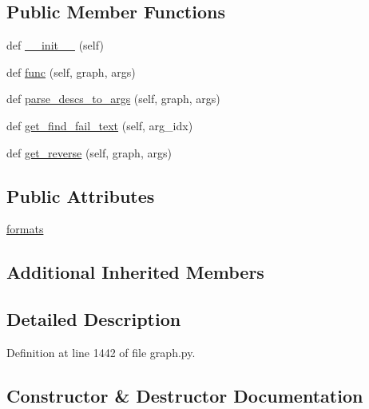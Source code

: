 \subsection*{Public Member Functions}
\begin{DoxyCompactItemize}
\item 
def \hyperlink{classlight__chats_1_1graph_1_1StealObjectFunction_a388f35f7fac6a0b0814254867c0509c4}{\+\_\+\+\_\+init\+\_\+\+\_\+} (self)
\item 
def \hyperlink{classlight__chats_1_1graph_1_1StealObjectFunction_a229fafa57d40e38da54a4b04947e2fe0}{func} (self, graph, args)
\item 
def \hyperlink{classlight__chats_1_1graph_1_1StealObjectFunction_a96475b7b415e03eb52d9efee518e755f}{parse\+\_\+descs\+\_\+to\+\_\+args} (self, graph, args)
\item 
def \hyperlink{classlight__chats_1_1graph_1_1StealObjectFunction_a1ffe38f920399831ab1fba3cd324c106}{get\+\_\+find\+\_\+fail\+\_\+text} (self, arg\+\_\+idx)
\item 
def \hyperlink{classlight__chats_1_1graph_1_1StealObjectFunction_a2e77998e7383d823d66f0adc22226ba0}{get\+\_\+reverse} (self, graph, args)
\end{DoxyCompactItemize}
\subsection*{Public Attributes}
\begin{DoxyCompactItemize}
\item 
\hyperlink{classlight__chats_1_1graph_1_1StealObjectFunction_a07d054e11c32eecd7c93102de254ffec}{formats}
\end{DoxyCompactItemize}
\subsection*{Additional Inherited Members}


\subsection{Detailed Description}
\begin{DoxyVerb}\end{DoxyVerb}
 

Definition at line 1442 of file graph.\+py.



\subsection{Constructor \& Destructor Documentation}
\mbox{\label{classlight__chats_1_1graph_1_1StealObjectFunction_a388f35f7fac6a0b0814254867c0509c4}} 
